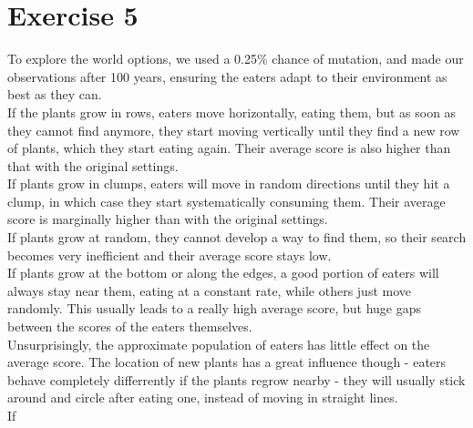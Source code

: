 \documentclass[a4paper,10pt]{article}
\begin{document}
\section*{Exercise 5}
To explore the world options, we used a 0.25\% chance of mutation, and made our observations after 100 years, ensuring the eaters adapt to their environment as best as they can.\\
If the plants grow in rows, eaters move horizontally, eating them, but as soon as they cannot find anymore, they start moving vertically until they find a new row of plants, which they start eating again. Their average score is also higher than that with the original settings.\\
If plants grow in clumps, eaters will move in random directions until they hit a clump, in which case they start systematically consuming them. Their average score is marginally higher than with the original settings.\\
If plants grow at random, they cannot develop a way to find them, so their search becomes very inefficient and their average score stays low.\\
If plants grow at the bottom or along the edges, a good portion of eaters will always stay near them, eating at a constant rate, while others just move randomly. This usually leads to a really high average score, but huge gaps between the scores of the eaters themselves.\\
Unsurprisingly, the approximate population of eaters has little effect on the average score. The location of new plants has a great influence though - eaters behave completely differrently if the plants regrow nearby - they will usually stick around and circle after eating one, instead of moving in straight lines.\\
If 
\end{document}
